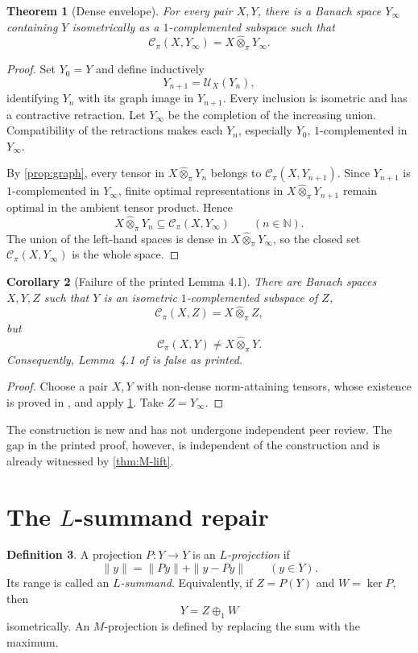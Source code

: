 \documentclass[11pt]{article}
\newtheorem{theorem}{Theorem}[section]
\newtheorem{corollary}[theorem]{Corollary}
\theoremstyle{definition}
\newtheorem{definition}[theorem]{Definition}
\theoremstyle{remark}
\newcommand{\N}{\mathbb N}
\newcommand{\whot}{\widehat\otimes_\pi}
\newcommand{\Cpi}{\mathscr C_\pi}
\begin{document}
\begin{theorem}[Dense envelope]\label{thm:dense-envelope}
For every pair $X,Y$, there is a Banach space $Y_\infty$ containing $Y$ isometrically as a $1$-complemented subspace such that
\[
 \Cpi(X,Y_\infty)=X\whot Y_\infty.
\]
\end{theorem}

\begin{proof}
Set $Y_0=Y$ and define inductively
\[
 Y_{n+1}=\mathcal U_X(Y_n),
\]
identifying $Y_n$ with its graph image in $Y_{n+1}$.  Every inclusion is isometric and has a contractive retraction.  Let $Y_\infty$ be the completion of the increasing union.  Compatibility of the retractions makes each $Y_n$, especially $Y_0$, $1$-complemented in $Y_\infty$.

By \cref{prop:graph}, every tensor in $X\whot Y_n$ belongs to $\Cpi(X,Y_{n+1})$.  Since $Y_{n+1}$ is $1$-complemented in $Y_\infty$, finite optimal representations in $X\whot Y_{n+1}$ remain optimal in the ambient tensor product.  Hence
\[
 X\whot Y_n\subseteq\Cpi(X,Y_\infty)
 \qquad(n\in\N).
\]
The union of the left-hand spaces is dense in $X\whot Y_\infty$, so the closed set $\Cpi(X,Y_\infty)$ is the whole space.
\end{proof}

\begin{corollary}[Failure of the printed Lemma 4.1]\label{cor:printed-false}
There are Banach spaces $X,Y,Z$ such that $Y$ is an isometric $1$-complemented subspace of $Z$,
\[
 \Cpi(X,Z)=X\whot Z,
\]
but
\[
 \Cpi(X,Y)\neq X\whot Y.
\]
Consequently, Lemma~4.1 of \cite{GarciaLirolaEtAl2025} is false as printed.
\end{corollary}

\begin{proof}
Choose a pair $X,Y$ with non-dense norm-attaining tensors, whose existence is proved in \cite[Theorem 5.1]{DantasEtAl2022}, and apply \cref{thm:dense-envelope}.  Take $Z=Y_\infty$.
\end{proof}

The construction is new and has not undergone independent peer review.  The gap in the printed proof, however, is independent of the construction and is already witnessed by \cref{thm:M-lift}.

\section{The $L$-summand repair}

\begin{definition}
A projection $P:Y\to Y$ is an \emph{$L$-projection} if
\[
 \|y\|=\|Py\|+\|y-Py\|
 \qquad(y\in Y).
\]
Its range is called an \emph{$L$-summand}.  Equivalently, if $Z=P(Y)$ and $W=\ker P$, then
\[
 Y=Z\oplus_1 W
\]
isometrically.  An $M$-projection is defined by replacing the sum with the maximum.
\end{definition}
\end{document}
